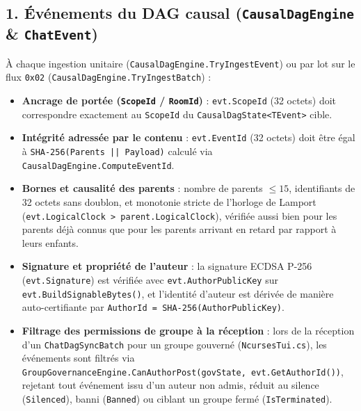 \documentclass[11pt,a4paper]{article}
\begin{document}
\subsection{1. Événements du DAG causal (\texttt{CausalDagEngine} \& \texttt{ChatEvent})}
À chaque ingestion unitaire (\texttt{CausalDagEngine.TryIngestEvent}) ou par lot sur le flux \texttt{0x02} (\texttt{CausalDagEngine.TryIngestBatch}) :
\begin{itemize}
    \item \textbf{Ancrage de portée (\texttt{ScopeId} / \texttt{RoomId})} : \texttt{evt.ScopeId} (32 octets) doit correspondre exactement au \texttt{ScopeId} du \texttt{CausalDagState<TEvent>} cible.
    \item \textbf{Intégrité adressée par le contenu} : \texttt{evt.EventId} (32 octets) doit être égal à \texttt{SHA-256(Parents || Payload)} calculé via \texttt{CausalDagEngine.ComputeEventId}.
    \item \textbf{Bornes et causalité des parents} : nombre de parents $\le 15$, identifiants de 32 octets sans doublon, et monotonie stricte de l'horloge de Lamport (\texttt{evt.LogicalClock > parent.LogicalClock}), vérifiée aussi bien pour les parents déjà connus que pour les parents arrivant en retard par rapport à leurs enfants.
    \item \textbf{Signature et propriété de l'auteur} : la signature ECDSA P-256 (\texttt{evt.Signature}) est vérifiée avec \texttt{evt.AuthorPublicKey} sur \texttt{evt.BuildSignableBytes()}, et l'identité d'auteur est dérivée de manière auto-certifiante par \texttt{AuthorId = SHA-256(AuthorPublicKey)}.
    \item \textbf{Filtrage des permissions de groupe à la réception} : lors de la réception d'un \texttt{ChatDagSyncBatch} pour un groupe gouverné (\texttt{NcursesTui.cs}), les événements sont filtrés via \texttt{GroupGovernanceEngine.CanAuthorPost(govState, evt.GetAuthorId())}, rejetant tout événement issu d'un auteur non admis, réduit au silence (\texttt{Silenced}), banni (\texttt{Banned}) ou ciblant un groupe fermé (\texttt{IsTerminated}).
\end{itemize}
\end{document}
